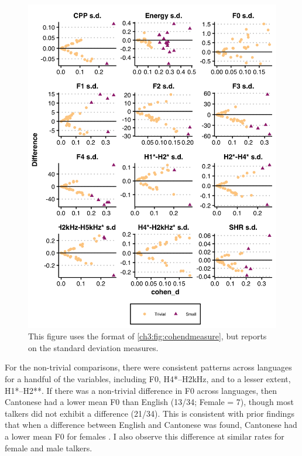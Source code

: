 \begin{figure}[htbp]
    \begin{center}
    \includegraphics[width=0.9\linewidth]{figures/ch3_cohend_part2_5in.png} 
    \caption{This figure uses the format of \ref{ch3:fig:cohendmeasure}, but reports on the standard deviation measures.}
    \label{ch3:fig:cohendsd}
    \end{center}
\end{figure}

For the non-trivial comparisons, there were consistent patterns across languages for a handful of the variables, including F0, H4*--H2kHz, and to a lesser extent, H1*--H2**. If there was a non-trivial difference in F0 across languages, then Cantonese had a lower mean F0 than English (13/34; Female = 7), though most talkers did not exhibit a difference (21/34). This is consistent with prior findings that when a difference between English and Cantonese was found, Cantonese had a lower mean F0 for females \citep{ng_2012_ltas,altenberg_2006_f0}. I also observe this difference at similar rates for female and male talkers.

